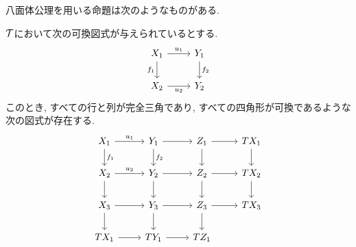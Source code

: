 \documentclass[uplatex, a4paper, 14Q, dvipdfmx]{jsarticle}
\begin{document}

八面体公理を用いる命題は次のようなものがある. 

\begin{lemma}[一般化八面体公理]
  $\mathcal{T}$において次の可換図式が与えられているとする. 
  \[\begin{tikzcd}
    {X_1} & {Y_1} \\
    {X_2} & {Y_2}
    \arrow["{u_1}", from=1-1, to=1-2]
    \arrow["{f_2}", from=1-2, to=2-2]
    \arrow["{f_1}"', from=1-1, to=2-1]
    \arrow["{u_2}"', from=2-1, to=2-2]
  \end{tikzcd}\]
  このとき, すべての行と列が完全三角であり, すべての四角形が可換であるような次の図式が存在する. 
  \[\begin{tikzcd}
    {X_1} & {Y_1} & {Z_1} & {TX_1} \\
    {X_2} & {Y_2} & {Z_2} & {TX_2} \\
    {X_3} & {Y_3} & {Z_3} & {TX_3} \\
    {TX_1} & {TY_1} & {TZ_1}
    \arrow["{u_1}", from=1-1, to=1-2]
    \arrow["{f_2}", from=1-2, to=2-2]
    \arrow["{f_1}", from=1-1, to=2-1]
    \arrow["{u_2}", from=2-1, to=2-2]
    \arrow[from=2-1, to=3-1]
    \arrow[from=3-1, to=4-1]
    \arrow[from=3-1, to=3-2]
    \arrow[from=4-1, to=4-2]
    \arrow[from=2-2, to=3-2]
    \arrow[from=3-2, to=4-2]
    \arrow[from=1-2, to=1-3]
    \arrow[from=2-2, to=2-3]
    \arrow[from=3-2, to=3-3]
    \arrow[from=4-2, to=4-3]
    \arrow[from=1-3, to=1-4]
    \arrow[from=1-4, to=2-4]
    \arrow[from=2-4, to=3-4]
    \arrow[from=3-3, to=3-4]
    \arrow[from=2-3, to=2-4]
    \arrow[from=1-3, to=2-3]
    \arrow[from=2-3, to=3-3]
    \arrow[from=3-3, to=4-3]
  \end{tikzcd}\]
\end{lemma}
\end{document}
